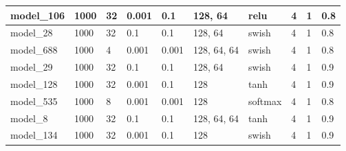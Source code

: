 \begin{tabular}{|l|l|l|l|l|l|l|l|l|l|}
model\_106     & 1000           & 32           & 0.001        & 0.1          & 128, 64     & relu         & 4           & 1            & 0.8               \\ \hline
model\_28      & 1000           & 32           & 0.1          & 0.1          & 128, 64     & swish        & 4           & 1            & 0.8               \\ \hline
model\_688     & 1000           & 4            & 0.001        & 0.001        & 128, 64, 64 & swish        & 4           & 1            & 0.8               \\ \hline
model\_29      & 1000           & 32           & 0.1          & 0.1          & 128, 64     & swish        & 4           & 1            & 0.9               \\ \hline
model\_128     & 1000           & 32           & 0.001        & 0.1          & 128         & tanh         & 4           & 1            & 0.9               \\ \hline
model\_535     & 1000           & 8            & 0.001        & 0.001        & 128         & softmax      & 4           & 1            & 0.8               \\ \hline
model\_8       & 1000           & 32           & 0.1          & 0.1          & 128, 64, 64 & tanh         & 4           & 1            & 0.9               \\ \hline
model\_134     & 1000           & 32           & 0.001        & 0.1          & 128         & swish        & 4           & 1            & 0.9               \\ \hline
\end{tabular}